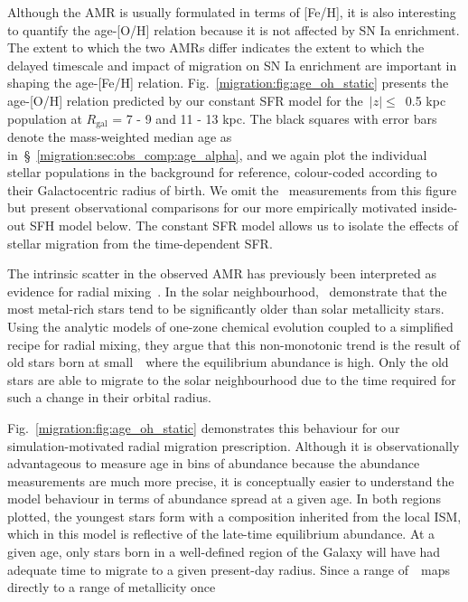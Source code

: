 Although the AMR is usually formulated in terms of 
[Fe/H], it is also interesting to quantify the age-[O/H] relation because it 
is not affected by SN Ia enrichment. 
The extent to which the two AMRs differ indicates the extent to which the 
delayed timescale and impact of migration on SN Ia enrichment are important in 
shaping the age-[Fe/H] relation. 
Fig.~\ref{migration:fig:age_oh_static} presents the age-[O/H] relation predicted by our 
constant SFR model for the~$\left|z\right|\leq$~0.5 kpc population at 
$R_\text{gal}$ = 7 - 9 and 11 - 13 kpc. 
The black squares with error bars denote the mass-weighted median age as 
in~\S~\ref{migration:sec:obs_comp:age_alpha}, and we again plot the individual stellar 
populations in the background for reference, colour-coded according to their 
Galactocentric radius of birth. 
We omit the~\citet{Feuillet2019} measurements from this figure but present 
observational comparisons for our more empirically motivated inside-out SFH 
model below. 
The constant SFR model allows us to isolate the effects of stellar migration 
from the time-dependent SFR. 
\par 
The intrinsic scatter in the observed AMR has previously been interpreted as 
evidence for radial mixing~\citep{Edvardsson1993, Sellwood2002}. 
In the solar neighbourhood,~\citet{Feuillet2018} demonstrate that the most 
metal-rich stars tend to be significantly older than solar metallicity stars. 
Using the \citet{Weinberg2017b} analytic models of one-zone chemical evolution 
coupled to a simplified recipe for radial mixing, they argue that this 
non-monotonic trend is the result of old stars born at small~\rgal~where the 
equilibrium abundance is high. 
Only the old stars are able to migrate to the solar neighbourhood due to the 
time required for such a change in their orbital radius. 
\par 
Fig.~\ref{migration:fig:age_oh_static} demonstrates this behaviour for our 
simulation-motivated radial migration prescription. Although it is 
observationally advantageous to measure age in bins of abundance because the 
abundance measurements are much more precise, it is conceptually easier to 
understand the model behaviour in terms of abundance spread at a given age. 
In both regions plotted, the youngest stars form with a composition inherited 
from the local ISM, which in this model is reflective of the late-time 
equilibrium abundance. 
At a given age, only stars born in a well-defined region of the 
Galaxy will have had adequate time to migrate to a given present-day radius. 
Since a range of~\rgal~maps directly to a range of metallicity once 
